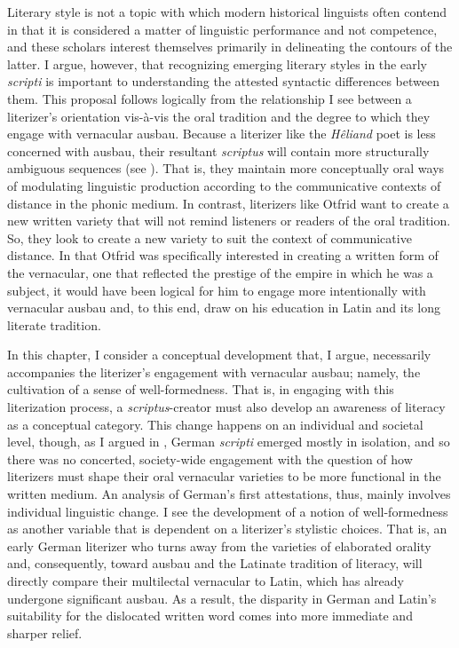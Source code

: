 Literary style is not a topic with which modern historical linguists often contend in that it is considered a matter of linguistic performance and not competence, and these scholars interest themselves primarily in delineating the contours of the latter. I argue, however, that recognizing emerging literary styles in the early \textit{scripti} is important to understanding the attested syntactic differences between them. This proposal follows logically from the relationship I see between a literizer’s orientation vis-à-vis the oral tradition and the degree to which they engage with vernacular ausbau. Because a literizer like the \textit{Hêliand} poet is less concerned with ausbau, their resultant \textit{scriptus} will contain more structurally ambiguous sequences (see ). That is, they maintain more conceptually oral ways of modulating linguistic production according to the communicative contexts of distance in the phonic medium. In contrast, literizers like Otfrid want to create a new written variety that will not remind listeners or readers of the oral tradition. So, they look to create a new variety to suit the context of communicative distance. In that Otfrid was specifically interested in creating a written form of the vernacular, one that reflected the prestige of the empire in which he was a subject, it would have been logical for him to engage more intentionally with vernacular ausbau and, to this end, draw on his education in Latin and its long literate tradition.

In this chapter, I consider a conceptual development that, I argue, necessarily accompanies the literizer’s engagement with vernacular ausbau; namely, the cultivation of a sense of well-formedness. That is, in engaging with this literization process, a \textit{scriptus}{}-creator must also develop an awareness of literacy as a conceptual category. This change happens on an individual and societal level, though, as I argued in , German \textit{scripti} emerged mostly in isolation, and so there was no concerted, society-wide engagement with the question of how literizers must shape their oral vernacular varieties to be more functional in the written medium. An analysis of German’s first attestations, thus, mainly involves individual linguistic change. I see the development of a notion of well-formedness as another variable that is dependent on a literizer’s stylistic choices. That is, an early German literizer who turns away from the varieties of elaborated orality and, consequently, toward ausbau and the Latinate tradition of literacy, will directly compare their multilectal vernacular to Latin, which has already undergone significant ausbau. As a result, the disparity in German and Latin’s suitability for the dislocated written word comes into more immediate and sharper relief.

